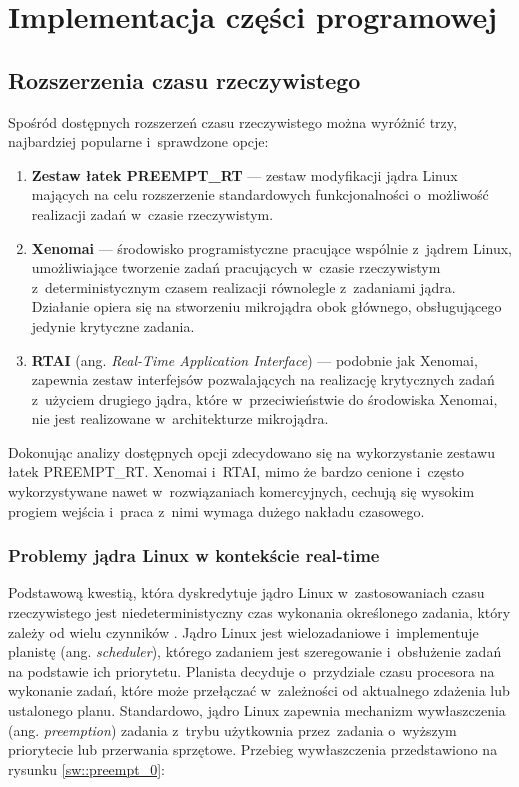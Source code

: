 \chapter{Implementacja części programowej}

\section{Rozszerzenia czasu rzeczywistego}

\par Spośród dostępnych rozszerzeń czasu rzeczywistego można wyróżnić trzy,
najbardziej popularne i~sprawdzone opcje:
\begin{enumerate}

    \item \textbf{Zestaw łatek PREEMPT\_RT} --- zestaw modyfikacji jądra Linux mających na
    celu rozszerzenie standardowych funkcjonalności o~możliwość realizacji zadań
    w~czasie rzeczywistym.

    \item \textbf{Xenomai} --- środowisko programistyczne pracujące wspólnie z~jądrem
    Linux, umożliwiające tworzenie zadań pracujących w~czasie rzeczywistym
    z~deterministycznym czasem realizacji równolegle z~zadaniami jądra.
    Działanie opiera się na stworzeniu mikrojądra obok głównego, obsługującego
    jedynie krytyczne zadania.

    \item \textbf{RTAI} (ang. \textit{Real-Time Application Interface}) --- podobnie jak
    Xenomai, zapewnia zestaw interfejsów pozwalających na realizację krytycznych
    zadań z~użyciem drugiego jądra, które w~przeciwieństwie do środowiska
    Xenomai, nie jest realizowane w~architekturze mikrojądra.

\end{enumerate}

Dokonując analizy dostępnych opcji zdecydowano się na wykorzystanie zestawu
łatek PREEMPT\_RT. Xenomai i~RTAI, mimo że bardzo cenione i~często
wykorzystywane nawet w~rozwiązaniach komercyjnych, cechują się wysokim progiem
wejścia i~praca z~nimi wymaga dużego nakładu czasowego. 

\subsection{Problemy jądra Linux w kontekście real-time}

Podstawową kwestią, która dyskredytuje jądro Linux w~zastosowaniach czasu
rzeczywistego jest niedeterministyczny czas wykonania określonego zadania, który
zależy od wielu czynników \cite{bib:preempt}. Jądro Linux jest wielozadaniowe
i~implementuje planistę (ang. \textit{scheduler}), którego zadaniem jest
szeregowanie i~obsłużenie zadań na podstawie ich priorytetu. Planista decyduje
o~przydziale czasu procesora na wykonanie zadań, które może przełączać
w~zależności od aktualnego zdażenia lub ustalonego planu. Standardowo, jądro
Linux zapewnia mechanizm wywłaszczenia (ang. \textit{preemption}) zadania
z~trybu użytkownia przez~zadania o~wyższym priorytecie lub przerwania sprzętowe.
Przebieg wywłaszczenia przedstawiono na rysunku \ref{sw::preempt_0}:

